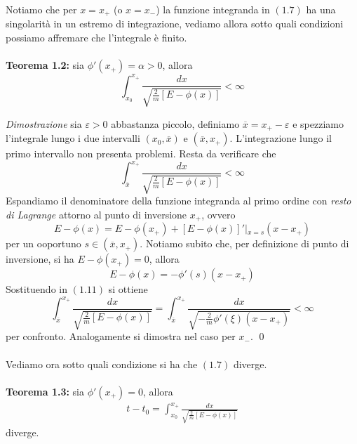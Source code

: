 \documentclass{article}
\begin{document}
Notiamo che per $x = x_+$ (o $x = x_-$) la funzione integranda in $(1.7)$ ha una singolarità in un estremo di integrazione, vediamo allora sotto quali condizioni possiamo affremare che l'integrale è finito. \\ \\
\textbf{Teorema 1.2:} sia $\phi'(x_+) = \alpha > 0$, allora
\begin{equation}
    \int_{x_0}^{x_+} \frac{dx}{\sqrt{\frac{2}{m}[E - \phi(x)]}} < \infty \tag{1.10}
\end{equation}

\textit{Dimostrazione} sia $\varepsilon > 0$ abbastanza piccolo, definiamo $\overline{x} = x_+ - \varepsilon$ e spezziamo l'integrale lungo i due intervalli $(x_0, \overline{x})$ e $(\overline{x}, x_+)$. L'integrazione lungo il primo intervallo non presenta problemi. Resta da verificare che
\begin{equation}
    \int_{\overline{x}}^{x_+} \frac{dx}{\sqrt{\frac{2}{m}[E - \phi(x)]}} < \infty \tag{1.11}
\end{equation}
Espandiamo il denominatore della funzione integranda al primo ordine con \textit{resto di Lagrange} attorno al punto di inversione $x_+$, ovvero
\begin{equation}
    E - \phi(x) = E - \phi(x_+) + [E - \phi(x)]'\left|_{x = s} \right.(x - x_+) \tag{1.12}
\end{equation}
per un ooportuno $s \in (\overline{x}, x_+)$. Notiamo subito che, per definizione di punto di inversione, si ha $E - \phi(x_+) = 0$, allora
\begin{equation}
    E - \phi(x) = -\phi'(s)(x - x_+) \tag{1.13}
\end{equation}
Sostituendo in $(1.11)$ si ottiene
\begin{equation}
    \int_{\overline{x}}^{x_+} \frac{dx}{\sqrt{\frac{2}{m}[E - \phi(x)]}} =  \int_{\overline{x}}^{x_+} \frac{dx}{\sqrt{-\frac{2}{m}\phi'(\xi)(x - x_+)}} < \infty \tag{1.14}
\end{equation}
per confronto. Analogamente si dimostra nel caso per $x_-$. \qed \\ \\
Vediamo ora sotto quali condizione si ha che $(1.7)$ diverge. \\ \\
\textbf{Teorema 1.3:} sia $\phi'(x_+) = 0$, allora
\begin{align}
    t - t_0 = \int_{x_0}^{x_+} \frac{dx}{\sqrt{\frac{2}{m}[E - \phi(x)]}} \tag{1.15}
\end{align}
diverge. \\
\end{document}
